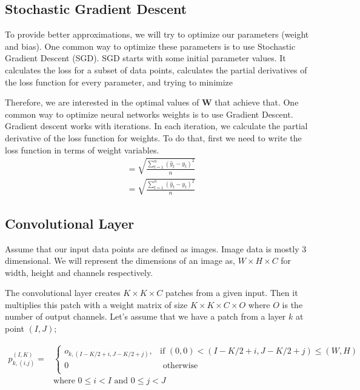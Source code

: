 \subsection{Stochastic Gradient Descent}
To provide better approximations, we will try to optimize our parameters (weight and bias). One common way to optimize these parameters is to use Stochastic Gradient Descent (SGD). SGD starts with some initial parameter values. It calculates the loss for a subset of data points, calculates the partial derivatives of the loss function for every parameter, and trying to minimize 

Therefore, we are interested in the optimal values of $\mathbf{W}$ that achieve that. 
One common way to optimize neural networks weights is to use Gradient Descent. Gradient descent works with iterations. In each iteration, we calculate the partial derivative of the loss function for weights. To do that, first we need to write the loss function in terms of weight variables.
\begin{equation*}
\begin{split}
 &= \sqrt{\frac{\sum^n_{t=1} (\hat y_t - y_t)^2 }{n}}\\
 &= \sqrt{\frac{\sum^n_{t=1} (\hat y_t - y_t)^2 }{n}}
\end{split}
\end{equation*}


\subsection{Convolutional Layer}

Assume that our input data points are defined as images. Image data is mostly 3 dimensional. We will represent the dimensions of an image as, $W \times H \times C$ for width, height and channels respectively. 

The convolutional layer creates $K \times K \times C$ patches from a given input. Then it multiplies this patch with a weight matrix of size $K \times K \times C \times O$ where $O$ is the number of output channels. Let's assume that we have a patch from a layer $k$ at point $(I, J)$; 

\begin{equation}
\label{eq:convolution_patches}
\begin{split}
    p^{(I,K)}_{k,(i.j)} = &
\begin{cases}
    o_{k,(I-K/2+i, J-K/2+j)}, & \text{if } (0,0) < (I-K/2+i, J-K/2+j) \leq (W,H)\\
    0 &  \text{ otherwise }\\
\end{cases}\\ 
&\text{where } 0 \leq i < I \text{ and } 0 \leq j < J
\end{split}
\end{equation}

